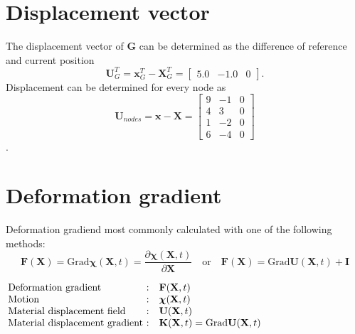 \documentclass[12pt]{article}
\begin{document}
\section{Displacement vector}
The displacement vector of \textbf{G} can be determined as the difference of reference and current position
\begin{equation}
  \textbf{U}_G^T =  \textbf{x}_G^T - \textbf{X}_G^T = \begin{bmatrix}
    5.0 & -1.0 & 0
  \end{bmatrix} \!.
\end{equation} 
Displacement can be determined for every node as
\begin{equation}
  \textbf{U}_{nodes} =  \textbf{x} - \textbf{X} = \begin{bmatrix}
    9 & -1 & 0 \\
    4 & 3 & 0\\
    1 & -2 & 0\\ 
    6 & -4 & 0
  \end{bmatrix}
\end{equation}.
\section{Deformation gradient}
Deformation gradiend most commonly calculated with one of the following methods:
\begin{equation}
  \textbf{F}(\textbf{X}) = \text{Grad} \bm{\chi} (\textbf{X},t) = \dfrac{\partial \bm{\chi} (\textbf{X},t)}{\partial \textbf{X}} \quad \text{or} \quad \textbf{F}(\textbf{X}) = \text{Grad} \textbf{U}(\textbf{X},t) + \textbf{I}
\end{equation}

\begin{equation*}
	\hspace{-5 cm}
	\begin{aligned}
	\text{Where}
	 \quad
	  \begin{array}{|l@{} c l}
		  \text{Deformation gradient}  & :  & \textbf{F}(\textbf{X},t) \\
		  \text{Motion}  & :  & \bm{\chi}(\textbf{X},t) \\
      \text{Material displacement field } & : & \textbf{U}(\textbf{X},t) \\
      \text{Material displacement gradient } & : & \textbf{K}(\textbf{X},t) = \text{Grad} \textbf{U}(\textbf{X},t)
	  \end{array}
  \end{aligned}
\end{equation*}
\end{document}
